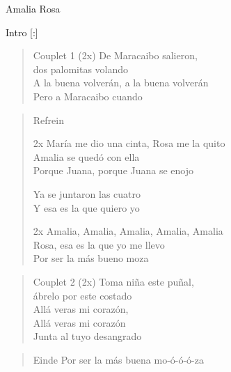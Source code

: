 \begin{song}[]{Amalia Rosa}

\begin{instrumental}{Intro} %
       \measure{}    [:]
         
\end{instrumental}

\begin{verse}{Couplet 1 (2x)}
    De Maracaibo salieron,\\
    dos palomitas volando\\
    A la buena volver\'an, \chord{}a la buena volver\'an\\
    Pero a Maracaibo cuando
\end{verse}

\begin{verse}{Refrein}
    \begin{sidenote}{2x}
        Mar\'ia me dio una cinta, Rosa me la quito\\
        \chord{}Amalia se qued\'o con ella\\
        Porque Juana, porque Juana se enojo\\
    \end{sidenote}
    Ya se juntaron las cuatro\\
    Y esa es la que quiero yo\\
    \begin{sidenote}{2x}
        Amalia, Amalia, Amalia, Amalia, Amalia\\
        Rosa, esa es la que yo me llevo\\
        Por ser la m\'as bueno moza
    \end{sidenote}

\end{verse}


\begin{verse}{Couplet 2 (2x)}
    Toma ni\~na este pu\~nal,\\
    \'abrelo por este costado\\
    All\'a veras mi coraz\'on,\chord{}    \\
    All\'a veras mi coraz\'on\\
    Junta al tuyo desangrado
\end{verse}

\begin{verse}{Einde}
    Por ser la m\'as buena mo-\'o-\'o-\'o-za
\end{verse}
\end{song}

\clearpage
\begin{translation}[]

\end{translation}
